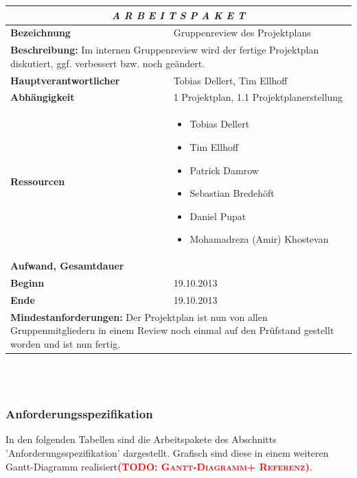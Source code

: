 \documentclass[fontsize=12pt,paper=a4,twoside]{scrartcl}
\newcommand{\todo}[1]{\textbf{\textsc{\textcolor{red}{(TODO: #1)}}}}
\begin{document}
\begin{tabular}{p{7.5cm}|p{7.5cm}}\toprule
\multicolumn{2}{c}{\textbf{\textit{A R B E I T S P A K E T \quad 1.2}}} \\ \toprule \hline
\textbf{Bezeichnung} & Gruppenreview des Projektplans\\\hline
\multicolumn{2}{p{15cm}}{\textbf{Beschreibung:} \newline 
Im internen Gruppenreview wird der fertige Projektplan diskutiert, ggf. verbessert bzw. noch geändert.}  \\\hline
\textbf{Hauptverantwortlicher} & Tobias Dellert, Tim Ellhoff \\\hline
\textbf{Abhängigkeit} & 1 Projektplan, 1.1 Projektplanerstellung\\\hline
\textbf{Ressourcen} & \begin{itemize}
\itemsep0pt
\item Tobias Dellert
\item Tim Ellhoff
\item Patrick Damrow
\item Sebastian Bredehöft
\item Daniel Pupat
\item Mohamadreza (Amir) Khostevan
\end{itemize} \\\hline
\textbf{Aufwand, Gesamtdauer} & \\\hline
\textbf{Beginn} & 19.10.2013 \\\hline
\textbf{Ende} & 19.10.2013\\\hline
\multicolumn{2}{p{15cm}}{\textbf{Mindestanforderungen: } \newline
Der Projektplan ist nun von allen Gruppenmitgliedern in einem Review noch einmal auf den Prüfstand gestellt worden und ist nun fertig. }  \\ \toprule
\end{tabular} \\\\

\subsubsection{Anforderungsspezifikation}\label{aps}

In den folgenden Tabellen sind die Arbeitspakete des Abschnitts 'Anforderungsspezifikation' dargestellt. Grafisch sind diese in einem weiteren Gantt-Diagramm realisiert\todo{Gantt-Diagramm+ Referenz}.
\end{document}
